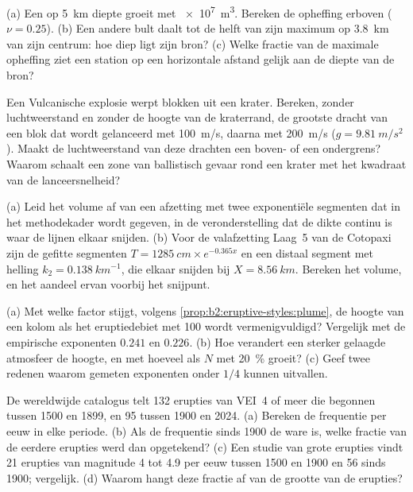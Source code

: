 \begin{exercise}[$\star\star$]\label{exo:b2:eruptive-styles:8}
(a) Een  op \qty{5}{km} diepte groeit met \qty{e7}{m^3}. Bereken de
opheffing erboven ($\nu = 0.25$). (b) Een andere bult daalt tot de helft van zijn maximum
op \qty{3.8}{km} van zijn centrum: hoe diep ligt zijn bron? (c) Welke fractie van de
maximale opheffing ziet een station op een horizontale afstand gelijk aan de diepte van de
bron?
\end{exercise}

\begin{exercise}[$\star\star$]\label{exo:b2:eruptive-styles:9}
Een Vulcanische explosie werpt blokken uit een krater. Bereken, zonder luchtweerstand
en zonder de hoogte van de kraterrand, de grootste dracht van een blok dat wordt gelanceerd
met \qty{100}{m/s}, daarna met \qty{200}{m/s} ($g = \qty{9.81}{m/s^2}$). Maakt de
luchtweerstand van deze drachten een boven- of een ondergrens? Waarom schaalt een zone van
ballistisch gevaar rond een krater met het kwadraat van de lanceersnelheid?
\end{exercise}

\begin{exercise}[$\star\star\star$]\label{exo:b2:eruptive-styles:10}
(a) Leid het volume af van een afzetting met twee exponentiële segmenten dat in het
methodekader wordt gegeven, in de veronderstelling dat de dikte continu is waar de lijnen elkaar snijden. (b) Voor
de valafzetting Laag~5 van de Cotopaxi zijn de gefitte segmenten $T = \qty{1285}{cm}\times
e^{-0.365x}$ en een distaal segment met helling $k_2 = \qty{0.138}{km^{-1}}$, die elkaar snijden bij
$X = \qty{8.56}{km}$. Bereken het volume, en het aandeel ervan voorbij het
snijpunt.
\end{exercise}

\begin{exercise}[$\star\star\star$]\label{exo:b2:eruptive-styles:11}
(a) Met welke factor stijgt, volgens \cref{prop:b2:eruptive-styles:plume}, de hoogte van een
kolom als het eruptiedebiet met 100 wordt vermenigvuldigd? Vergelijk met de
empirische exponenten $0.241$ en $0.226$. (b) Hoe verandert een sterker
gelaagde atmosfeer de hoogte, en met hoeveel als $N$ met
\qty{20}{\percent} groeit? (c) Geef twee redenen waarom gemeten exponenten onder
$1/4$ kunnen uitvallen.
\end{exercise}

\begin{exercise}[$\star\star\star$]\label{exo:b2:eruptive-styles:12}
De wereldwijde catalogus telt 132 erupties van VEI~4 of meer die begonnen tussen 1500
en 1899, en 95 tussen 1900 en 2024. (a) Bereken de frequentie per eeuw in elke
periode. (b) Als de frequentie sinds 1900 de ware is, welke fractie van de eerdere
erupties werd dan opgetekend? (c) Een studie van grote erupties vindt 21 erupties van
magnitude 4 tot 4.9 per eeuw tussen 1500 en 1900 en 56 sinds 1900; vergelijk.
(d) Waarom hangt deze fractie af van de grootte van de erupties?
\end{exercise}

